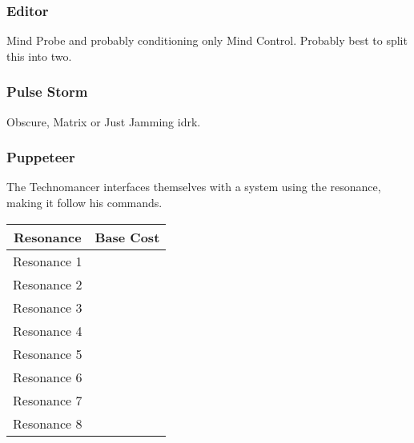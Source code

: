 \begin{multicols*}{3}
	\subsubsection*{Editor}
	
	Mind Probe and probably conditioning only Mind Control. Probably best to split this into two.
	
	\subsubsection*{Pulse Storm}
	
	Obscure, Matrix or Just Jamming idrk. 
	
	\subsubsection*{Puppeteer}
	
	The Technomancer interfaces themselves with a system using the resonance, making it follow his commands.
	
	\begin{center}
		\begin{tabular}{|c|c|}
			\hline
			Resonance & Base Cost\\
			\hline
			\hline
			Resonance 1 &  \\
			Resonance 2 &  \\
			Resonance 3 &  \\
			Resonance 4 &  \\
			Resonance 5 &  \\
			Resonance 6 &  \\
			Resonance 7 &  \\
			Resonance 8 &  \\
			\hline
		\end{tabular}
	\end{center}
	

\end{multicols*}
